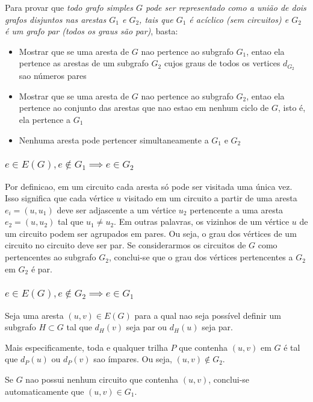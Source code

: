 \documentclass{article}
\begin{document}
   
  Para provar que \textit{todo grafo simples $G$ pode ser representado como a união de dois grafos disjuntos nas arestas $G_1$ e $G_2$, tais que $G_1$ é acíclico (sem circuitos) e $G_2$ é um grafo par (todos os graus são par)}, basta:
  
  \begin{itemize}
  	\item Mostrar que se uma aresta de $G$ nao pertence ao subgrafo $G_1$, entao ela pertence as arestas de um subgrafo $G_2$ cujos graus de todos os vertices $d_{G_2}$ sao números pares
  	\item Mostrar que se uma aresta de $G$ nao pertence ao subgrafo $G_2$, entao ela pertence ao conjunto das arestas que nao estao em nenhum ciclo de $G$, isto é, ela pertence a $G_1$
  	\item Nenhuma aresta pode pertencer simultaneamente a $G_1$ e $G_2$
  \end{itemize}
 
 
 \subsubsection{$e \in E(G), e \notin G_1 \implies e  \in G_2 $} 
  
Por definicao, em um circuito cada aresta só pode ser visitada uma única vez. Isso significa que cada vértice $u$ visitado em um circuito a partir de uma aresta $e_i = (u, u_1)$  deve ser adjascente a um vértice $u_2$ pertencente a uma aresta $e_2 = (u,u_2)$ tal que $u_1 \neq u_2$. Em outras palavras, os vizinhos de um vértice $u$ de um circuito podem ser agrupados em pares. Ou seja, o grau dos vértices de um circuito no circuito deve ser par. Se considerarmos os circuitos de $G$ como pertencentes ao subgrafo $G_2$, conclui-se que o grau dos vértices pertencentes a $G_2$  em  $G_2$ é par.


 \subsubsection{$e \in E(G), e \notin G_2\implies e  \in G_1 $} 

Seja uma aresta $(u,v) \in E(G)$ para a qual nao seja possível definir um subgrafo $H \subset G$ tal que $d_{H}(v)$ seja par ou $d_{H}(u)$ seja par. 

Mais especificamente, toda e qualquer trilha $P$ que contenha $(u,v)$ em $G$ é tal que $d_P(u)$ ou $d_P(v)$ sao ímpares. Ou seja, $(u,v) \notin G_2$.

Se $G$ nao possui nenhum circuito que contenha $(u,v)$, conclui-se automaticamente que  $(u,v) \in G_1$.
\end{document}
